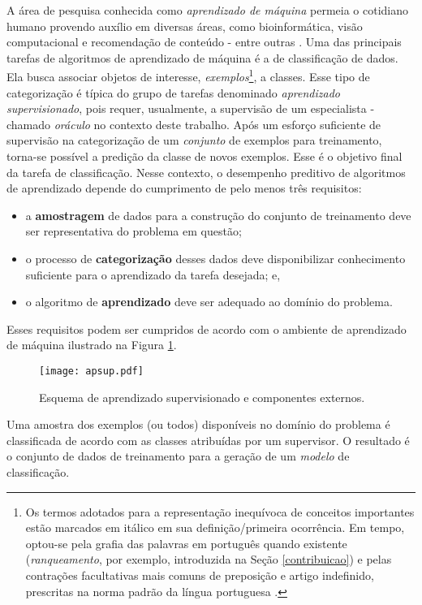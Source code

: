 A área de pesquisa conhecida como \textit{aprendizado de máquina} permeia o cotidiano humano provendo auxílio em diversas áreas, como bioinformática, visão computacional e recomendação de conteúdo - entre outras \cite{journals/bmcbi/WangLLXHXL14,conf/nips/KrizhevskySH12,reference/rsh/RicciRS11}.
Uma das principais tarefas de algoritmos de aprendizado de máquina é a de classificação de dados.
Ela busca associar objetos de interesse, \textit{exemplos}\footnote{
Os termos adotados para a representação inequívoca de conceitos importantes estão marcados em itálico em sua definição/primeira ocorrência.
Em tempo, optou-se pela grafia das palavras em português quando existente (\textit{ranqueamento}, por exemplo, introduzida na Seção \ref{contribuicao}) e pelas contrações facultativas mais comuns de preposição e artigo indefinido, prescritas na norma padrão da língua portuguesa \cite{lima1973gramatica,academia2004vocabulario}.
}, a classes.
Esse tipo de categorização é típica do grupo de tarefas denominado \textit{aprendizado supervisionado}, pois requer, usualmente, a supervisão de um especialista - chamado \textit{oráculo} no contexto deste trabalho.
Após um esforço suficiente de supervisão na categorização de um \textit{conjunto} de exemplos para treinamento, torna-se possível a predição da classe de novos exemplos.
Esse é o objetivo final da tarefa de classificação.
Nesse contexto, o desempenho preditivo de algoritmos de aprendizado depende do cumprimento de pelo menos três 
requisitos:
\begin{itemize}
 \item a \textbf{amostragem} de dados para a construção do conjunto de treinamento deve ser representativa do problema em questão;
 \item o processo de \textbf{categorização} desses dados deve disponibilizar conhecimento suficiente para o aprendizado da tarefa desejada; e,
 \item o algoritmo de \textbf{aprendizado} deve ser adequado ao domínio do problema.
\end{itemize}
Esses requisitos podem ser cumpridos de acordo com o ambiente de aprendizado de máquina ilustrado na Figura \ref{aprsup}.
\begin{figure}
  \setlength{\unitlength}{1.0cm}
  \centering
    \texttt{[image: apsup.pdf]}
  \caption[Esquema de aprendizado supervisionado.]{Esquema de aprendizado supervisionado e componentes externos.}
  \label{aprsup}
\end{figure}
Uma amostra dos exemplos (ou todos) disponíveis no domínio do problema é classificada de acordo com as classes atribuídas por um supervisor.
O resultado é o conjunto de dados de treinamento para a geração de um \textit{modelo} de classificação.

